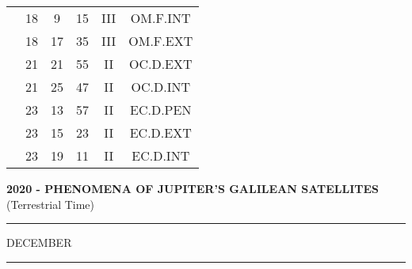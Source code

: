 \documentclass[12pt, a4paper]{article}
\begin{document}
\begin{multicols}{3}
{\begin{tabular}{c c c c c c}
	 	 	 	 & 18 & 9 & 15 & III & OM.F.INT\\%
	 	 	 	 & 18 & 17 & 35 & III & OM.F.EXT\\%
	 	 	 	 & 21 & 21 & 55 & II & OC.D.EXT\\%
	 	 	 	 & 21 & 25 & 47 & II & OC.D.INT\\%
	 	 	 	 & 23 & 13 & 57 & II & EC.D.PEN\\%
	 	 	 	 & 23 & 15 & 23 & II & EC.D.EXT\\%
	 	 	 	 & 23 & 19 & 11 & II & EC.D.INT\\%
	 	 \end{tabular}
 	}
\end{multicols}
\textbf{2020 - PHENOMENA OF JUPITER'S GALILEAN SATELLITES}\\(Terrestrial Time) 
\vspace{0.1cm} \hrule \vspace{0.1cm}
DECEMBER\vspace{0.1cm}
\hrule
\vspace{-0.2cm}
\end{document}
